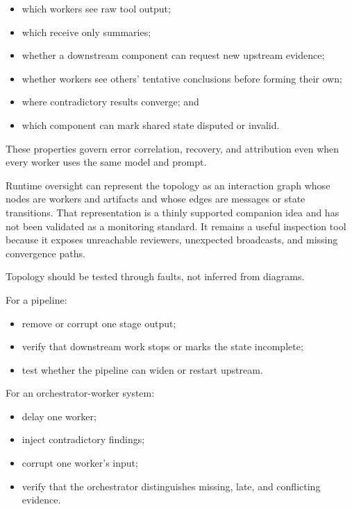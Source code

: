 \begin{itemize}
\tightlist
\item
  which workers see raw tool output;
\item
  which receive only summaries;
\item
  whether a downstream component can request new upstream evidence;
\item
  whether workers see others' tentative conclusions before forming their own;
\item
  where contradictory results converge; and
\item
  which component can mark shared state disputed or invalid.
\end{itemize}

These properties govern error correlation, recovery, and attribution even when every worker uses the same model and prompt.

Runtime oversight can represent the topology as an interaction graph whose nodes are workers and artifacts and whose edges are messages or state transitions. That representation is a thinly supported companion idea and has not been validated as a monitoring standard. It remains a useful inspection tool because it exposes unreachable reviewers, unexpected broadcasts, and missing convergence paths.

Topology should be tested through faults, not inferred from diagrams.


For a pipeline:

\begin{itemize}
\tightlist
\item
  remove or corrupt one stage output;
\item
  verify that downstream work stops or marks the state incomplete;
\item
  test whether the pipeline can widen or restart upstream.
\end{itemize}


For an orchestrator-worker system:

\begin{itemize}
\tightlist
\item
  delay one worker;
\item
  inject contradictory findings;
\item
  corrupt one worker's input;
\item
  verify that the orchestrator distinguishes missing, late, and conflicting evidence.
\end{itemize}

